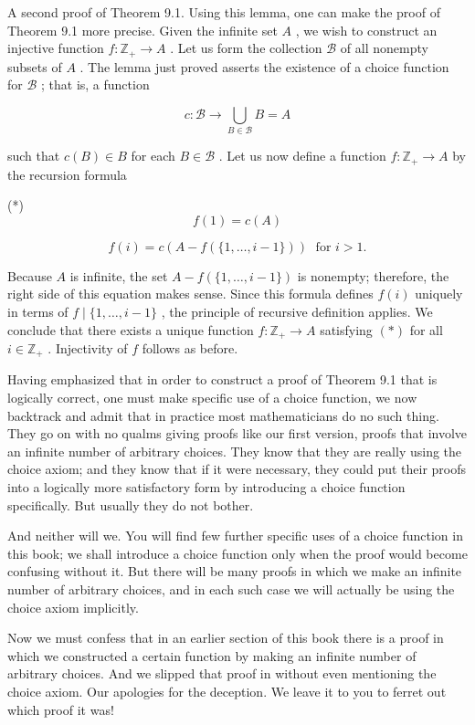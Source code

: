 A second proof of Theorem 9.1. Using this lemma, one can make the proof of Theorem 9.1 more precise. Given the infinite set \(A\) , we wish to construct an injective function \(f : {\mathbb{Z}}_{ + } \rightarrow  A\) . Let us form the collection \(\mathcal{B}\) of all nonempty subsets of \(A\) . The lemma just proved asserts the existence of a choice function for \(\mathcal{B}\) ; that is, a function

\[
c : \mathcal{B} \rightarrow  \mathop{\bigcup }\limits_{{B \in  \mathcal{B}}}B = A
\]

such that \(c\left( B\right)  \in  B\) for each \(B \in  \mathcal{B}\) . Let us now define a function \(f : {\mathbb{Z}}_{ + } \rightarrow  A\) by the recursion formula

(*)
\[
f\left( 1\right)  = c\left( A\right)
\]

\[
f\left( i\right)  = c\left( {A - f\left( {\{ 1,\ldots ,i - 1\} }\right) }\right) \;\text{ for }i > 1.
\]

Because \(A\) is infinite, the set \(A - f\left( {\{ 1,\ldots ,i - 1\} }\right)\) is nonempty; therefore, the right side of this equation makes sense. Since this formula defines \(f\left( i\right)\) uniquely in terms of \(f \mid  \{ 1,\ldots ,i - 1\}\) , the principle of recursive definition applies. We conclude that there exists a unique function \(f : {\mathbb{Z}}_{ + } \rightarrow  A\) satisfying \(\left( *\right)\) for all \(i \in  {\mathbb{Z}}_{ + }\) . Injectivity of \(f\) follows as before.

Having emphasized that in order to construct a proof of Theorem 9.1 that is logically correct, one must make specific use of a choice function, we now backtrack and admit that in practice most mathematicians do no such thing. They go on with no qualms giving proofs like our first version, proofs that involve an infinite number of arbitrary choices. They know that they are really using the choice axiom; and they know that if it were necessary, they could put their proofs into a logically more satisfactory form by introducing a choice function specifically. But usually they do not bother.

And neither will we. You will find few further specific uses of a choice function in this book; we shall introduce a choice function only when the proof would become confusing without it. But there will be many proofs in which we make an infinite number of arbitrary choices, and in each such case we will actually be using the choice axiom implicitly.

Now we must confess that in an earlier section of this book there is a proof in which we constructed a certain function by making an infinite number of arbitrary choices. And we slipped that proof in without even mentioning the choice axiom. Our apologies for the deception. We leave it to you to ferret out which proof it was!

